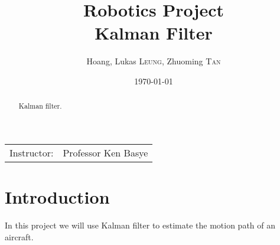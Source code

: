 \documentclass[12pt]{article}
\title{Robotics Project \\ Kalman Filter} %
\author{Hoang, Lukas \textsc{Leung}, Zhuoming \textsc{Tan}} %
\date{\today} %
\begin{document}
	\maketitle %

	\begin{center}
		\begin{tabular}{l r}
			Instructor: & Professor Ken Basye \\ %
		\end{tabular}
	\end{center}

	\begin{abstract}
	Kalman filter.
	\end{abstract}




	\section{Introduction}\label{sec:intro}


	In this project we will use Kalman filter to estimate the motion path of an aircraft.
\end{document}

